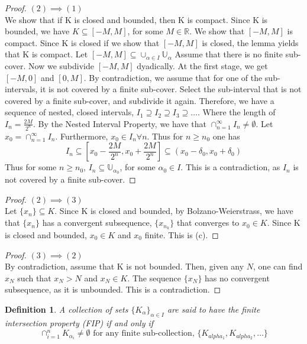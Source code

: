 \documentclass[12pt,reqno]{amsart}
\theoremstyle{plain}
\newtheorem*{definition}{Definition}
\begin{document}
    \begin{proof}{$(2)\implies(1)$} \\
        We show that if K is closed and bounded, then K is compact.
        Since K is bounded, we have $K \subseteq [-M, M]$, for some $M \in \mathbb{R}$. We show that $[-M, M]$ is compact.
        Since K is closed if we show that $[-M, M]$ is closed, the lemma yields that K is compact.
        Let $[-M, M] \subseteq \cup_{\alpha \in I} \mathbb{U}_\alpha$
        Assume that there is no finite sub-cover. 
        Now we subdivide $[-M, M]$ dyadically. At the first stage, we get $[-M, 0]$ and $[0, M]$. By contradiction, we assume that for one of the sub-intervals, it is not covered by a finite sub-cover.
        Select the sub-interval that is not covered by a finite sub-cover, and subdivide it again.
        Therefore, we have a sequence of nested, closed intervals, $I_1 \supseteq I_2 \supseteq I_3 \supseteq \dots$.
        Where the length of $I_n = \frac{2M}{2^n}$.
        By the Nested Interval Property, we have that $\cap_{n = 1}^\infty I_n \neq \emptyset$.
        Let $x_0 = \cap_{n = 1}^\infty I_n$.
        Furthermore, $x_0 \in I_n \forall n$. Thus for $n \ge n_0$ one has 
        \[ I_n \subseteq \left[x_0 - \frac{2M}{2^n}, x_0 + \frac{2M}{2^n}\right] \subseteq (x_0 - \delta_0, x_0 + \delta_0)\]
        Thus for some $n \ge n_0$, $I_n \subseteq \mathbb{U}_{\alpha_0}$, for some $\alpha_0 \in I$.
        This is a contradiction, as $I_n$ is not covered by a finite sub-cover.
    \end{proof}

    \begin{proof}{$(2) \implies (3)$} \\
        Let $\{ x_n\} \subseteq K$. Since K is closed and bounded, by Bolzano-Weierstrass, we have that $\{x_n\}$ has a convergent subsequence, $\{x_{n_k}\}$ that converges to $x_0 \in K$.
        Since K is closed and bounded, $x_0 \in K$ and $x_0$ finite. This is (c).
    \end{proof}

    \begin{proof}{$(3) \implies (2)$} \\
        By contradiction, assume that K is not bounded. Then, given any $N$, one can find $x_N$ such that $x_N > N$ and $x_N \in K$.
        The sequence $\{x_N\}$ has no convergent subsequence, as it is unbounded. This is a contradiction.
    \end{proof}

    \begin{definition}
        A collection of sets ${\{ K_\alpha\}}_{\alpha \in I}$ are said to have the finite intersection property (FIP) if and only if 
        \[ \cap_{i = 1}^n K_{\alpha_i} \neq \emptyset \text{ for any finite sub-collection, }\{ K_{alpha_1}, K_{alpha_2}, \dots \}\]
    \end{definition}
\end{document}
